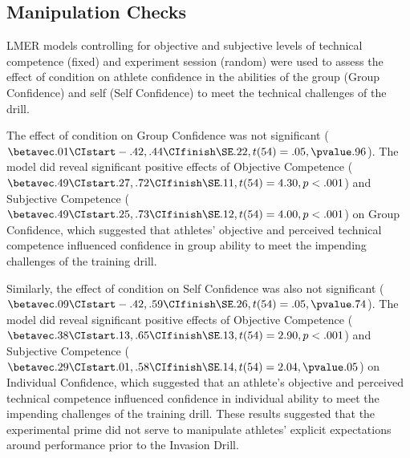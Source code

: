 



\subsection{Manipulation Checks}

LMER models controlling for objective and subjective levels of technical competence (fixed) and experiment session (random) were used to assess the effect of condition on athlete confidence in the abilities of the group (Group Confidence) and self (Self Confidence) to meet the technical challenges of the drill.

The effect of condition on Group Confidence was not significant ($\betavec .01 \CIstart -.42, .44 \CIfinish \SE .22, t(54)= .05, \pvalue .96$). The model did reveal significant positive effects of Objective Competence ($\betavec .49 \CIstart .27, .72 \CIfinish \SE .11, t(54)= 4.30, p <.001$) and Subjective Competence ($\betavec .49 \CIstart .25, .73 \CIfinish \SE .12, t(54)= 4.00, p < .001$) on Group Confidence, which suggested that athletes' objective and perceived technical competence influenced confidence in group ability to meet the impending challenges of the training drill.

Similarly, the effect of condition on Self Confidence was also not significant ($\betavec .09 \CIstart -.42, .59 \CIfinish \SE .26, t(54)= .05, \pvalue .74$). The model did reveal significant positive effects of Objective Competence ($\betavec .38 \CIstart .13, .65 \CIfinish \SE .13, t(54)= 2.90, p <.001$) and Subjective Competence ($\betavec .29 \CIstart .01, .58 \CIfinish \SE .14, t(54)= 2.04, \pvalue .05$) on Individual Confidence, which suggested that an athlete's objective and perceived technical competence influenced confidence in individual ability to meet the impending challenges of the training drill.  These results suggested that the experimental prime did not serve to manipulate athletes' explicit expectations around performance prior to the Invasion Drill.

